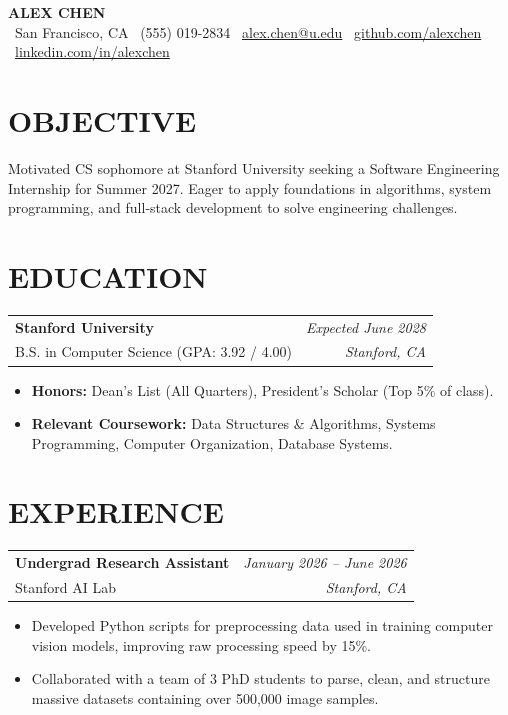 \documentclass[10pt,letterpaper]{article}
\makeatletter
\newcommand{\resumeentry}[4]{%
  \noindent
  \begin{tabularx}{\linewidth}{@{}X r@{}}
    {\bfseries\color{darkneutral}#1} & {\color{muted}\small\itshape #2} \\
    {\color{muted}\small #3} & {\color{muted}\small\itshape #4} \\
  \end{tabularx}%
  \vspace{0.2mm}%
}
\makeatother
\begin{document}
\begin{center}
  {\Huge\bfseries\color{accent} ALEX CHEN} \\
  \vspace{1.0mm}
  \color{darkneutral}
  \small
  \faMapMarker\ San Francisco, CA \quad\textbullet\quad
  \faPhone\ (555) 019-2834 \quad\textbullet\quad
  \faEnvelope\ \href{mailto:alex.chen@u.edu}{alex.chen@u.edu} \quad\textbullet\quad
  \faGithub\ \href{https://github.com/alexchen}{github.com/alexchen} \quad\textbullet\quad
  \faLinkedin\ \href{https://linkedin.com/in/alexchen}{linkedin.com/in/alexchen}
\end{center}

\vspace{0.2mm}

\section{OBJECTIVE}
\color{darkneutral}
Motivated CS sophomore at Stanford University seeking a Software Engineering Internship for Summer 2027. Eager to apply foundations in algorithms, system programming, and full-stack development to solve engineering challenges.

\section{EDUCATION}
\resumeentry{Stanford University}{Expected June 2028}{B.S. in Computer Science (GPA: 3.92 / 4.00)}{Stanford, CA}
\begin{itemize}
  \item \textbf{Honors:} Dean's List (All Quarters), President's Scholar (Top 5\% of class).
  \item \textbf{Relevant Coursework:} Data Structures \& Algorithms, Systems Programming, Computer Organization, Database Systems.
\end{itemize}

\section{EXPERIENCE}
\resumeentry{Undergrad Research Assistant}{January 2026 -- June 2026}{Stanford AI Lab}{Stanford, CA}
\begin{itemize}
  \item Developed Python scripts for preprocessing data used in training computer vision models, improving raw processing speed by 15\%.
  \item Collaborated with a team of 3 PhD students to parse, clean, and structure massive datasets containing over 500,000 image samples.
\end{itemize}
\end{document}
